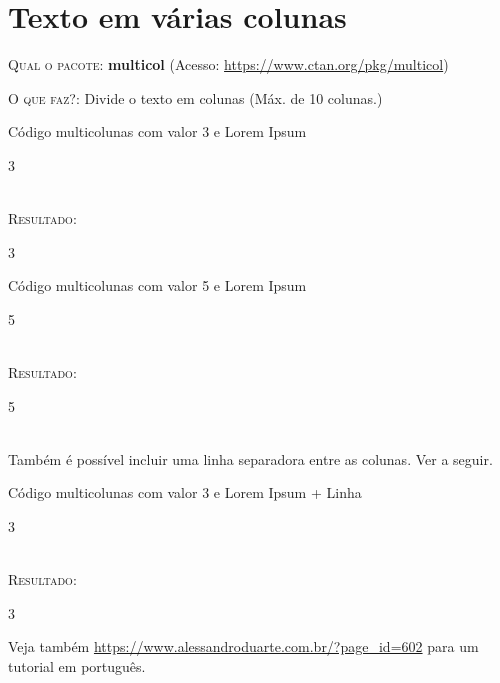 \chapter{Texto em várias colunas}

\textsc{Qual o pacote:} \textbf{multicol} (Acesso: \url{https://www.ctan.org/pkg/multicol})

\textsc{O que faz?}: Divide o texto em colunas (Máx. de 10 colunas.)
\ \\

\begin{codex}{Código multicolunas com valor 3 e Lorem Ipsum}
\begin{multicols}{3}
\lipsum[2]
\end{multicols}
\end{codex}
\ \\

\textsc{Resultado}:
\ \\

\begin{multicols}{3}
	\lipsum[2]
\end{multicols}

\begin{codex}{Código multicolunas com valor 5 e Lorem Ipsum}
\begin{multicols}{5}
\lipsum[2]
\end{multicols}
\end{codex}
\ \\

\textsc{Resultado}:

\begin{multicols}{5}
	\lipsum[2]
\end{multicols}
\ \\
Também é possível incluir uma linha separadora entre as colunas. Ver a seguir.
\ \\

\begin{codex}{Código multicolunas com valor 3 e Lorem Ipsum + Linha}
\begin{multicols}{3}
\setlength{\columnseprule}{0.2pt}
\lipsum[2]
\end{multicols}
\end{codex}
\ \\

\textsc{Resultado}:

\begin{multicols}{3}
	\setlength{\columnseprule}{0.2pt}
	\lipsum[2]
\end{multicols}

Veja também \url{https://www.alessandroduarte.com.br/?page_id=602} para um tutorial em português.
